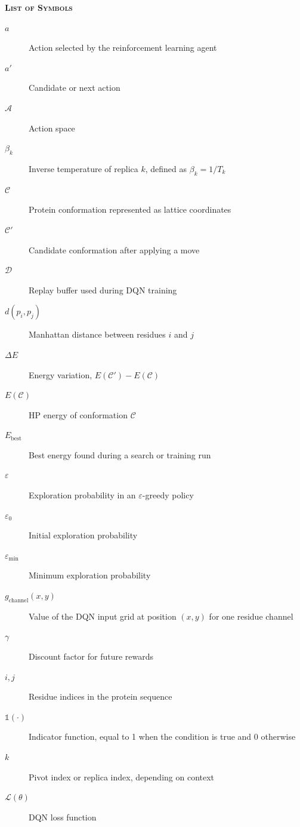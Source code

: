 
\vspace*{45pt}
\begin{flushleft}
	{\Large \textbf{\scshape{List of Symbols}}}
\end{flushleft}
\vspace*{20pt}

\begin{description}
    \item[$a$] Action selected by the reinforcement learning agent
    \item[$a'$] Candidate or next action
    \item[$\mathcal{A}$] Action space
    \item[$\beta_k$] Inverse temperature of replica $k$, defined as $\beta_k = 1/T_k$
    \item[$\mathcal{C}$] Protein conformation represented as lattice coordinates
    \item[$\mathcal{C}'$] Candidate conformation after applying a move
    \item[$\mathcal{D}$] Replay buffer used during DQN training
    \item[$d(p_i,p_j)$] Manhattan distance between residues $i$ and $j$
    \item[$\Delta E$] Energy variation, $E(\mathcal{C}') - E(\mathcal{C})$
    \item[$E(\mathcal{C})$] HP energy of conformation $\mathcal{C}$
    \item[$E_{\text{best}}$] Best energy found during a search or training run
    \item[$\varepsilon$] Exploration probability in an $\varepsilon$-greedy policy
    \item[$\varepsilon_0$] Initial exploration probability
    \item[$\varepsilon_{\min}$] Minimum exploration probability
    \item[$g_{\text{channel}}(x,y)$] Value of the DQN input grid at position $(x,y)$ for one residue channel
    \item[$\gamma$] Discount factor for future rewards
    \item[$i,j$] Residue indices in the protein sequence
    \item[$\mathbb{1}(\cdot)$] Indicator function, equal to 1 when the condition is true and 0 otherwise
    \item[$k$] Pivot index or replica index, depending on context
    \item[$\mathcal{L}(\theta)$] DQN loss function

\end{description}
